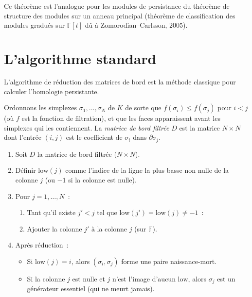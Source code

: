 \begin{remarque}
Ce th\'eor\`eme est l'analogue pour les modules de persistance du
th\'eor\`eme de structure des modules sur un anneau principal (th\'eor\`eme
de classification des modules gradu\'es sur $\mathbb{F}[t]$ d\^u \`a
Zomorodian--Carlsson, 2005).
\end{remarque}

\section{L'algorithme standard}

L'algorithme de r\'eduction des matrices de bord est la m\'ethode
classique pour calculer l'homologie persistante.

\begin{definition}
Ordonnons les simplexes $\sigma_1, \ldots, \sigma_N$ de $K$ de sorte
que $f(\sigma_i) \leq f(\sigma_j)$ pour $i < j$ (o\`u $f$ est la
fonction de filtration), et que les faces apparaissent avant les
simplexes qui les contiennent. La \emph{matrice de bord filtr\'ee}
$D$ est la matrice $N \times N$ dont l'entr\'ee $(i, j)$ est le
coefficient de $\sigma_i$ dans $\partial \sigma_j$.
\end{definition}

\begin{algorithme}[title=\textbf{R\'eduction de la matrice de bord}]
\begin{enumerate}
  \item Soit $D$ la matrice de bord filtr\'ee ($N \times N$).
  \item D\'efinir $\mathrm{low}(j)$ comme l'indice de la ligne la plus
        basse non nulle de la colonne $j$ (ou $-1$ si la colonne est
        nulle).
  \item Pour $j = 1, \ldots, N$~:
    \begin{enumerate}
      \item Tant qu'il existe $j' < j$ tel que
            $\mathrm{low}(j') = \mathrm{low}(j) \neq -1$~:
      \item Ajouter la colonne $j'$ \`a la colonne $j$ (sur $\mathbb{F}$).
    \end{enumerate}
  \item Apr\`es r\'eduction~:
    \begin{itemize}
      \item Si $\mathrm{low}(j) = i$, alors $(\sigma_i, \sigma_j)$ forme
            une paire naissance-mort.
      \item Si la colonne $j$ est nulle et $j$ n'est l'image d'aucun
            $\mathrm{low}$, alors $\sigma_j$ est un g\'en\'erateur
            essentiel (qui ne meurt jamais).
    \end{itemize}
\end{enumerate}
\end{algorithme}

